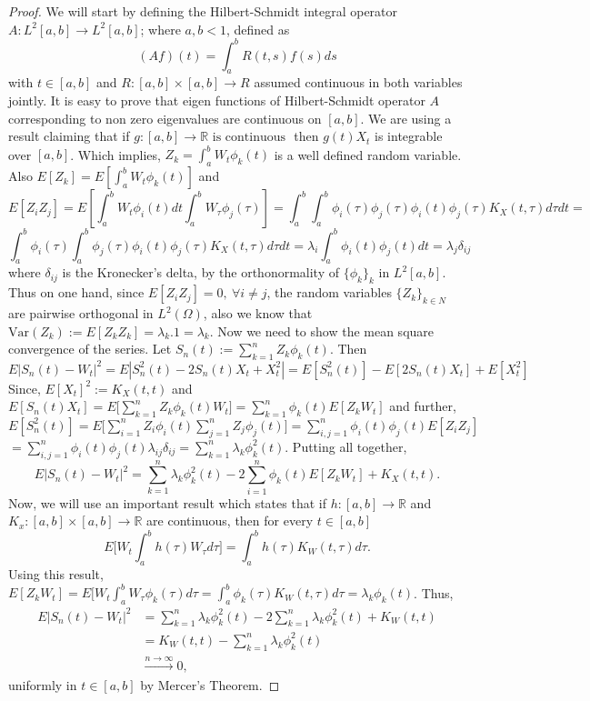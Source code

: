 \documentclass[12pt]{report}
\begin{document}
 \begin{proof}
     We will start by defining the Hilbert-Schmidt integral operator $A: L^2[a,b] \rightarrow L^2[a,b]$; where $a,b<1$, defined as
     \[
     (Af)(t) = \int_a^b R(t,s)f(s)ds
     \]
     with $t \in [a,b]$ and $R: [a,b] \times [a,b] \rightarrow R$ assumed continuous in both variables jointly. It is easy to prove that eigen functions of Hilbert-Schmidt operator $A$ corresponding to non zero eigenvalues are continuous on $[a,b]$. We are using a result claiming that if $g: [a,b] \rightarrow \mathbb{R} \text{ is continuous }$ then $g(t)X_t$ is integrable over $[a,b]$.
     Which implies, $Z_k = \int_a^b W_t \phi_k(t)$ is a well defined random variable. Also $E[Z_k]=E[\int_a^bW_t\phi_k(t)]$ and 
     \[
     E[Z_iZ_j] = E[\int_a^b W_t\phi_i(t) dt \int_a^bW_\tau \phi_j(\tau)] = \int_a^b \int_a^b \phi_i(\tau) \phi_j(\tau) \phi_i(t) \phi_j(\tau) K_X(t,\tau) d\tau dt =
     \]
     \[
     \int_a^b \phi_i(\tau) \int_a^b \phi_j(\tau) \phi_i(t) \phi_j(\tau) K_X(t,\tau) d\tau dt = \lambda_i \int_a^b\phi_i(t) \phi_j(t)dt =\lambda_j \delta_{ij}
     \]
     where $\delta_{ij}$ is the Kronecker's delta, by the orthonormality of $\{\phi_k\}_k$ in $L^2[a,b].$ Thus on one hand, since $E[Z_iZ_j]=0,\ \forall i\neq j$, the random variables $\{Z_k\}_{k\in N}$ are pairwise orthogonal in $L^2(\Omega)$, also we know that $\text{Var}(Z_k) := E[Z_kZ_k] = \lambda_k.1 = \lambda_k$.
     Now we need to show the mean square convergence of the series. Let $S_n(t) := \sum_{k=1}^n Z_k\phi_k(t)$. Then 
     \[
     E|S_n(t) - W_t|^2 = E|S_n^2(t)-2S_n(t)X_t+X_t^2| = E[S_n^2(t)]-E[2S_n(t)X_t]+E[X_t^2]
     \]
     Since, $E[X_t]^2 := K_X(t,t)$ and $E[S_n(t)X_t]= E\bigg[\sum_{k=1}^n Z_k\phi_k(t) W_t\bigg] = \sum_{k=1}^n \phi_k(t) E[Z_kW_t]$ and further, $E[S_n^2(t)] = E\bigg[\sum_{i=1}^n Z_i\phi_i(t) \sum_{j=1}^n Z_j \phi_j(t)\bigg] = \sum_{i,j=1}^n \phi_i(t)\phi_j(t)E[Z_iZ_j]$\\
     $=\sum_{i,j=1}^n\phi_i(t)\phi_j(t)\lambda_{ij}\delta_{ij}=\sum_{k=1}^n \lambda_k\phi_k^2(t)$. Putting all together,
     \[
     E|S_n(t) -W_t|^2 = \sum_{k=1}^n \lambda_k\phi_k^2(t)- 2\sum_{i=1}^n\phi_k(t) E[Z_kW_t]  +K _X(t,t).
     \]
     Now, we will use an important result which states that if $h:[a,b] \rightarrow \mathbb{R}$ and $K_x: [a,b]\times [a,b] \rightarrow \mathbb{R}$ are continuous, then for every $t\in [a,b]$
     \[
     E\bigg[W_t\int_a^bh(\tau)W_\tau d\tau \bigg] = \int_a^bh(\tau)K_W(t,\tau) d\tau.
     \]
     Using this result, $E[Z_kW_t] = E[W_t \int_a^bW_\tau \phi_k(\tau)d\tau = \int_a^b \phi_k(\tau) K_W(t,\tau)d\tau =\lambda_k\phi_k(t)$. Thus,
     \begin{align*}
         E|S_n(t) - W_t|^2 &= \sum_{k=1}^n\lambda_k\phi_k^2(t) - 2\sum_{k=1}^n \lambda_k\phi_k^2(t) + K_W(t,t) \\
         &= K_W(t,t) - \sum_{k=1}^n\lambda_k\phi_k^2(t)\\
         & \xrightarrow{n\rightarrow\infty} 0 ,
     \end{align*}
     uniformly in $t\in [a,b]$ by Mercer's Theorem.
 \end{proof}
\end{document}
